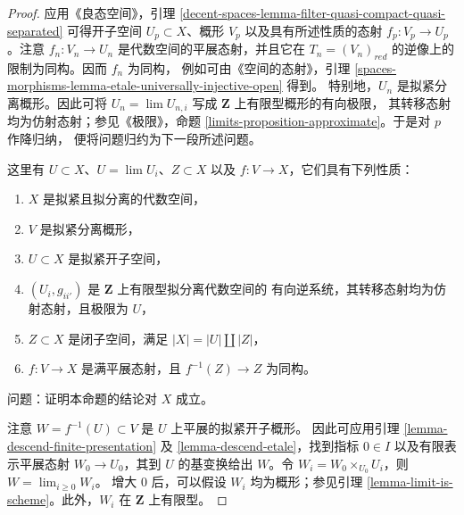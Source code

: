 \begin{proof}
应用《良态空间》，引理
\ref{decent-spaces-lemma-filter-quasi-compact-quasi-separated}
可得开子空间 $U_p \subset X$、概形 $V_p$ 以及具有所述性质的态射
$f_p : V_p \to U_p$。注意
$f_n : V_n \to U_n$ 是代数空间的平展态射，并且它在
$T_n = (V_n)_{red}$ 的逆像上的限制为同构。因而 $f_n$ 为同构，
例如可由《空间的态射》，引理
\ref{spaces-morphisms-lemma-etale-universally-injective-open} 得到。
特别地，$U_n$ 是拟紧分离概形。因此可将
$U_n = \lim U_{n,i}$ 写成 $\mathbf{Z}$ 上有限型概形的有向极限，
其转移态射均为仿射态射；参见《极限》，命题
\ref{limits-proposition-approximate}。于是对 $p$ 作降归纳，
便将问题归约为下一段所述问题。

\medskip\noindent
这里有 $U \subset X$、$U = \lim U_i$、$Z \subset X$ 以及
$f : V \to X$，它们具有下列性质：
\begin{enumerate}
\item $X$ 是拟紧且拟分离的代数空间，
\item $V$ 是拟紧分离概形，
\item $U \subset X$ 是拟紧开子空间，
\item $(U_i, g_{ii'})$ 是 $\mathbf{Z}$ 上有限型拟分离代数空间的
有向逆系统，其转移态射均为仿射态射，且极限为 $U$，
\item $Z \subset X$ 是闭子空间，满足 $|X| = |U| \amalg |Z|$，
\item $f : V \to X$ 是满平展态射，且
$f^{-1}(Z) \to Z$ 为同构。
\end{enumerate}
问题：证明本命题的结论对 $X$ 成立。

\medskip\noindent
注意 $W = f^{-1}(U) \subset V$ 是 $U$ 上平展的拟紧开子概形。
因此可应用引理 \ref{lemma-descend-finite-presentation} 及
\ref{lemma-descend-etale}，找到指标 $0 \in I$ 以及有限表示平展态射
$W_0 \to U_0$，其到 $U$ 的基变换给出 $W$。令
$W_i = W_0 \times_{U_0} U_i$，则 $W = \lim_{i \geq 0} W_i$。
增大 $0$ 后，可以假设 $W_i$ 均为概形；参见引理
\ref{lemma-limit-is-scheme}。此外，$W_i$ 在 $\mathbf{Z}$ 上有限型。


\end{proof}
